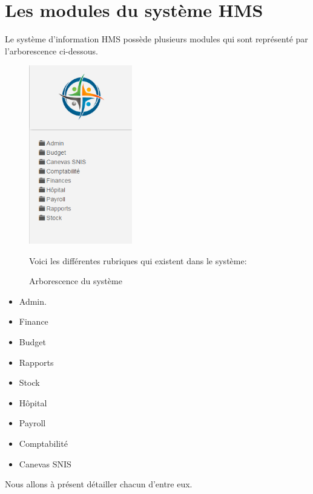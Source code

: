\documentclass[12pt,a4paper]{report}
\begin{document}
\section{Les modules du système HMS}
Le système d'information HMS possède plusieurs modules qui sont représenté par l'arborescence ci-dessous.
\begin{figure}[h]
\begin{center}
\includegraphics[width=4.5cm]{pic/arbo.png}
\end{center}
\caption{Arborescence du système}
\label{Arborescence du système}
Voici les différentes rubriques qui existent dans le système:
\end{figure} 
\begin{itemize}
\item Admin. %
\item Finance
\item Budget
\item Rapports
\item Stock
\item Hôpital
\item Payroll
\item Comptabilité
\item Canevas SNIS
\end{itemize}
Nous allons à présent détailler chacun d'entre eux.
\newpage
    
\end{document}
